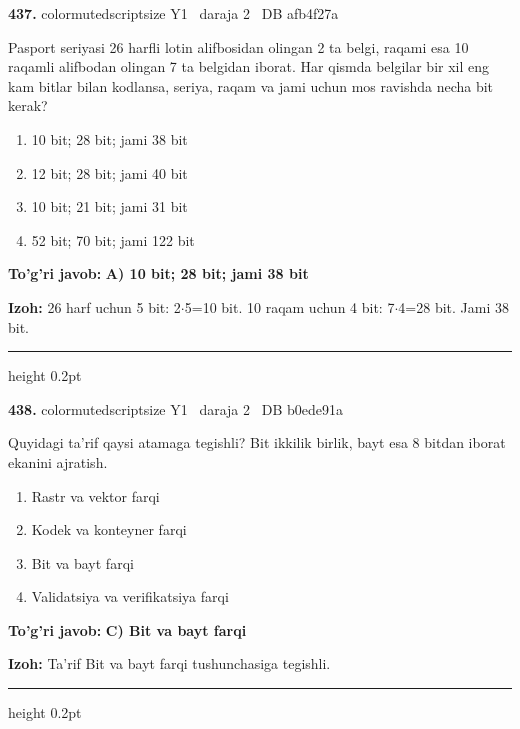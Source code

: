 \documentclass[10pt,a4paper,oneside]{article}
\begin{document}
\noindent\textbf{\color{ink}437.}  {color{muted}scriptsize Y1 \textbullet\ daraja 2 \textbullet\ DB afb4f27a}
\par
Pasport seriyasi 26 harfli lotin alifbosidan olingan 2 ta belgi, raqami esa 10 raqamli alifbodan olingan 7 ta belgidan iborat. Har qismda belgilar bir xil eng kam bitlar bilan kodlansa, seriya, raqam va jami uchun mos ravishda necha bit kerak?
\begin{enumerate}[label=\Alph*),leftmargin=9mm]
\item 10 bit; 28 bit; jami 38 bit
\item 12 bit; 28 bit; jami 40 bit
\item 10 bit; 21 bit; jami 31 bit
\item 52 bit; 70 bit; jami 122 bit
\end{enumerate}
\begin{tcolorbox}[enhanced,breakable,colback=teal!4,colframe=teal!50!black,boxrule=0.5pt,arc=1.1mm,left=3mm,right=3mm,top=1.7mm,bottom=1.7mm,before skip=2mm,after skip=2mm]
\textbf{\color{teal}To'g'ri javob:} \textbf{A) 10 bit; 28 bit; jami 38 bit}
\par\smallskip
\textbf{Izoh:} 26 harf uchun 5 bit: 2\ensuremath{\cdot}5=10 bit. 10 raqam uchun 4 bit: 7\ensuremath{\cdot}4=28 bit. Jami 38 bit.
\end{tcolorbox}
\vspace{2mm}\hrule height 0.2pt \vspace{3mm}

\noindent\textbf{\color{ink}438.}  {color{muted}scriptsize Y1 \textbullet\ daraja 2 \textbullet\ DB b0ede91a}
\par
Quyidagi ta'rif qaysi atamaga tegishli? Bit ikkilik birlik, bayt esa 8 bitdan iborat ekanini ajratish.
\begin{enumerate}[label=\Alph*),leftmargin=9mm]
\item Rastr va vektor farqi
\item Kodek va konteyner farqi
\item Bit va bayt farqi
\item Validatsiya va verifikatsiya farqi
\end{enumerate}
\begin{tcolorbox}[enhanced,breakable,colback=teal!4,colframe=teal!50!black,boxrule=0.5pt,arc=1.1mm,left=3mm,right=3mm,top=1.7mm,bottom=1.7mm,before skip=2mm,after skip=2mm]
\textbf{\color{teal}To'g'ri javob:} \textbf{C) Bit va bayt farqi}
\par\smallskip
\textbf{Izoh:} Ta'rif Bit va bayt farqi tushunchasiga tegishli.
\end{tcolorbox}
\vspace{2mm}\hrule height 0.2pt \vspace{3mm}
\end{document}
